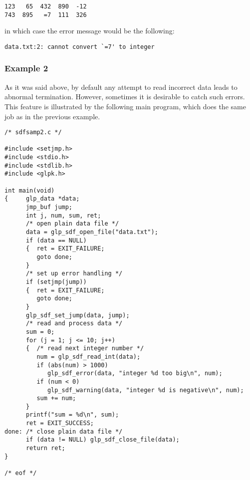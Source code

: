 \begin{footnotesize}
\begin{verbatim}
123   65  432  890  -12
743  895   =7  111  326
\end{verbatim}
\end{footnotesize}

\noindent
in which case the error message would be the following:

\begin{footnotesize}
\begin{verbatim}
data.txt:2: cannot convert `=7' to integer
\end{verbatim}
\end{footnotesize}

\subsubsection*{Example 2}

As it was said above, by default any attempt to read incorrect data
leads to abnormal termination. However, sometimes it is desirable to
catch such errors. This feature is illustrated by the following main
program, which does the same job as in the previous example.

\begin{footnotesize}
\begin{verbatim}
/* sdfsamp2.c */

#include <setjmp.h>
#include <stdio.h>
#include <stdlib.h>
#include <glpk.h>

int main(void)
{     glp_data *data;
      jmp_buf jump;
      int j, num, sum, ret;
      /* open plain data file */
      data = glp_sdf_open_file("data.txt");
      if (data == NULL)
      {  ret = EXIT_FAILURE;
         goto done;
      }
      /* set up error handling */
      if (setjmp(jump))
      {  ret = EXIT_FAILURE;
         goto done;
      }
      glp_sdf_set_jump(data, jump);
      /* read and process data */
      sum = 0;
      for (j = 1; j <= 10; j++)
      {  /* read next integer number */
         num = glp_sdf_read_int(data);
         if (abs(num) > 1000)
            glp_sdf_error(data, "integer %d too big\n", num);
         if (num < 0)
            glp_sdf_warning(data, "integer %d is negative\n", num);
         sum += num;
      }
      printf("sum = %d\n", sum);
      ret = EXIT_SUCCESS;
done: /* close plain data file */
      if (data != NULL) glp_sdf_close_file(data);
      return ret;
}

/* eof */
\end{verbatim}
\end{footnotesize}

